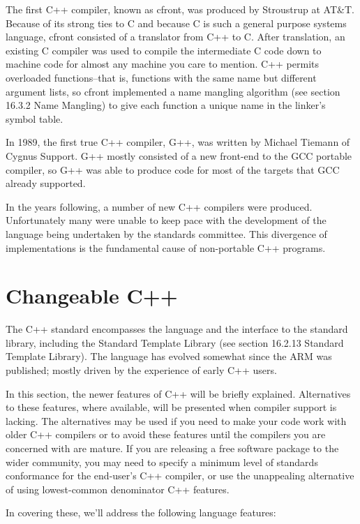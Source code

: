 The first C++ compiler, known as cfront, was produced by Stroustrup at AT\&T. Because of its strong ties to C and because C is such a general purpose systems language, cfront consisted of a translator from C++ to C. After translation, an existing C compiler was used to compile the intermediate C code down to machine code for almost any machine you care to mention. C++ permits overloaded functions--that is, functions with the same name but different argument lists, so cfront implemented a name mangling algorithm (see section 16.3.2 Name Mangling) to give each function a unique name in the linker's symbol table.

In 1989, the first true C++ compiler, G++, was written by Michael Tiemann of Cygnus Support. G++ mostly consisted of a new front-end to the GCC portable compiler, so G++ was able to produce code for most of the targets that GCC already supported.

In the years following, a number of new C++ compilers were produced. Unfortunately many were unable to keep pace with the development of the language being undertaken by the standards committee. This divergence of implementations is the fundamental cause of non-portable C++ programs. 

\section{Changeable C++}

The C++ standard encompasses the language and the interface to the standard library, including the Standard Template Library (see section 16.2.13 Standard Template Library). The language has evolved somewhat since the ARM was published; mostly driven by the experience of early C++ users.

In this section, the newer features of C++ will be briefly explained. Alternatives to these features, where available, will be presented when compiler support is lacking. The alternatives may be used if you need to make your code work with older C++ compilers or to avoid these features until the compilers you are concerned with are mature. If you are releasing a free software package to the wider community, you may need to specify a minimum level of standards conformance for the end-user's C++ compiler, or use the unappealing alternative of using lowest-common denominator C++ features.

In covering these, we'll address the following language features:

